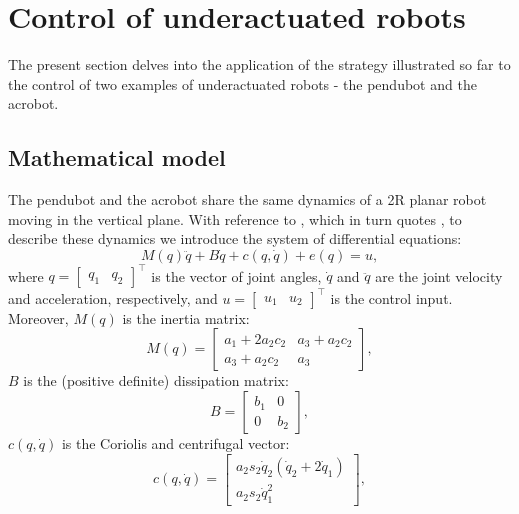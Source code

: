 \section{Control of underactuated robots}
The present section delves into the application of the strategy illustrated so far to the control of two examples of underactuated robots - the pendubot and the acrobot.
\subsection{Mathematical model}
The pendubot and the acrobot share the same dynamics of a 2R planar robot moving in the vertical plane. With reference to \cite{lanarioriolo}, which in turn quotes \cite{siciliano}, to describe these dynamics we introduce the system of differential equations:
\begin{equation}
    M(q) \ddot{q} + B \dot{q} + c(q, \dot{q}) + e(q) = u, \label{eq:dyn_robot}
\end{equation}
where $q = \begin{bmatrix} q_1 & q_2 \end{bmatrix}^\top$ is the vector of joint angles, $\dot{q}$ and $\ddot{q}$ are the joint velocity and acceleration, respectively, and $u = \begin{bmatrix} u_1 & u_2 \end{bmatrix}^\top$ is the control input. \\
Moreover, $M(q)$ is the inertia matrix:
\begin{equation*}
    M(q) = \begin{bmatrix}
        a_1 + 2a_2 c_2 & a_3 + a_2 c_2 \\
        a_3 + a_2 c_2 & a_3
    \end{bmatrix},
\end{equation*}
$B$ is the (positive definite) dissipation matrix: 
\begin{equation*}
    B = \begin{bmatrix}
        b_1 & 0 \\
        0 & b_2
    \end{bmatrix},
\end{equation*}
$c(q, \dot{q})$ is the Coriolis and centrifugal vector: 
\begin{equation*}
    c(q, \dot{q}) = \begin{bmatrix}
        a_2 s_2 \dot{q}_2 (\dot{q}_2 + 2 \dot{q}_1) \\
        a_2 s_2 \dot{q}_1^2
    \end{bmatrix},
\end{equation*}
